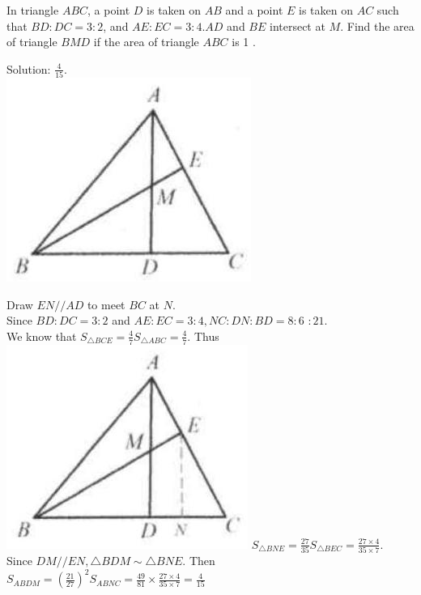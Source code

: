 \documentclass{article}
\begin{document}
In triangle \(A B C\), a point \(D\) is taken on \(A B\) and a point \(E\) is taken on \(A C\) such that \(B D: D C=3: 2\), and \(A E: E C=3: 4 . A D\) and \(B E\) intersect at \(M\). Find the area of triangle \(B M D\) if the area of triangle \(A B C\) is 1 .

Solution: \(\frac{4}{15}\).\\
\centering
\includegraphics[width=\textwidth]{images/107.jpg}

Draw \(E N / / A D\) to meet \(B C\) at \(N\).\\
Since \(B D: D C=3: 2\) and \(A E: E C=3: 4, N C: D N: B D=8: 6\) \(: 21\).\\
We know that \(S_{\triangle B C E}=\frac{4}{7} S_{\triangle A B C}=\frac{4}{7}\). Thus\\
\includegraphics[width=\textwidth]{images/107(2).jpg} \(S_{\triangle B N E}=\frac{27}{35} S_{\triangle B E C}=\frac{27 \times 4}{35 \times 7}\).\\
Since \(D M / / E N, \triangle B D M \sim \triangle B N E\). Then \(S_{A B D M}=\left(\frac{21}{27}\right)^{2} S_{A B N C}=\frac{49}{81} \times \frac{27 \times 4}{35 \times 7}=\frac{4}{15}\)\\
\end{document}
